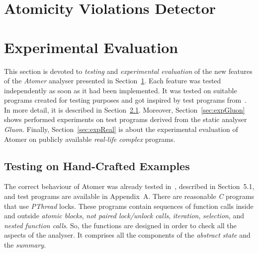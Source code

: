 
\section{Atomicity Violations Detector}
\label{sec:atomer}



\section{Experimental Evaluation}
\label{sec:exp}

This section is devoted to \emph{testing} and \emph{experimental evaluation}
of the new features of the \emph{Atomer} analyser presented in
Section~\ref{sec:atomer}. Each feature was tested independently as soon as it
had been implemented. It was tested on suitable programs created for testing
purposes and got inspired by test programs from~\cite{harmimBP}. In more
detail, it is described in Section~\ref{sec:expPurpos}. Moreover,
Section~\ref{sec:expGluon} shows performed experiments on test programs
derived from the static analyser \emph{Gluon}. Finally,
Section~\ref{sec:expReal} is about the experimental evaluation of Atomer on
publicly available \emph{real-life complex} programs.

\subsection{Testing on Hand-Crafted Examples}
\label{sec:expPurpos}

The correct behaviour of Atomer was already tested in~\cite{harmimBP}, described
in Section~5.1, and test programs are available in Appendix~A. There are
reasonable \emph{C} programs that use \emph{PThread} locks. These programs
contain sequences of function calls inside and outside \emph{atomic blocks},
\emph{not paired lock/unlock calls}, \emph{iteration}, \emph{selection}, and
\emph{nested function calls}. So, the functions are designed in order to
check all the aspects of the analyser. It comprises all the components of
the \emph{abstract state} and the \emph{summary}.

